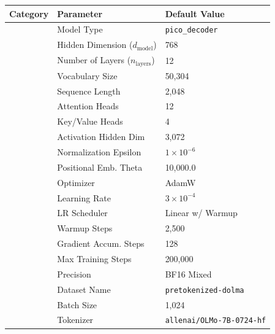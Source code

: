 \begin{table}[h!]
    \centering
    \renewcommand{\arraystretch}{1.2} %
    \setlength{\tabcolsep}{8pt} %
    \footnotesize
    \begin{tabular}{|>{\centering\arraybackslash}p{3cm}|p{5cm}|p{5.5cm}|}
        \hline
        \textbf{Category} & \textbf{Parameter} & \textbf{Default Value} \\
        \hline
        \multirow{10}{*}{\textbf{Model}}  
            & Model Type & \texttt{pico\_decoder} \\
            & Hidden Dimension ($d_{\text{model}}$) & 768 \\
            & Number of Layers ($n_{\text{layers}}$) & 12 \\
            & Vocabulary Size & 50,304 \\
            & Sequence Length & 2,048 \\
            & Attention Heads & 12 \\
            & Key/Value Heads & 4 \\
            & Activation Hidden Dim & 3,072 \\
            & Normalization Epsilon & $1 \times 10^{-6}$ \\
            & Positional Emb. Theta & 10,000.0 \\
        \hline
        \multirow{7}{*}{\textbf{Training}}  
            & Optimizer & AdamW \\
            & Learning Rate & $3 \times 10^{-4}$ \\
            & LR Scheduler & Linear w/ Warmup \\
            & Warmup Steps & 2,500 \\
            & Gradient Accum. Steps & 128 \\
            & Max Training Steps & 200,000 \\
            & Precision & BF16 Mixed \\
        \hline
        \multirow{3}{*}{\textbf{Data}}  
            & Dataset Name & \texttt{pretokenized-dolma} \\
            & Batch Size & 1,024 \\
            & Tokenizer & \texttt{allenai/OLMo-7B-0724-hf} \\

\end{tabular}
\end{table}
